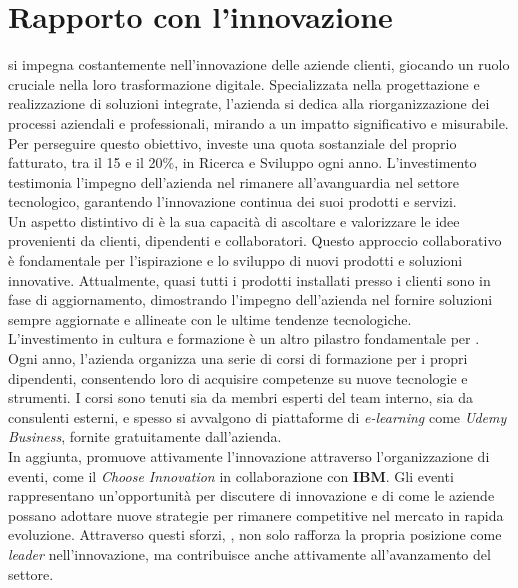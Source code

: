 \section{Rapporto con l'innovazione}

\noindent{\azienda} si impegna costantemente nell'innovazione delle aziende clienti, giocando un ruolo cruciale nella loro trasformazione digitale. 
Specializzata nella progettazione e realizzazione di soluzioni integrate, l'azienda si dedica alla riorganizzazione dei processi aziendali e 
professionali, mirando a un impatto significativo e misurabile. \\
\noindent Per perseguire questo obiettivo, {\azienda} investe una quota sostanziale del proprio fatturato, tra il 15 e il 20\%, 
in Ricerca e Sviluppo ogni anno. L'investimento testimonia l'impegno dell'azienda nel rimanere all'avanguardia nel settore tecnologico, 
garantendo l'innovazione continua dei suoi prodotti e servizi. \\
\noindent Un aspetto distintivo di {\azienda} è la sua capacità di ascoltare e valorizzare le idee provenienti da clienti, dipendenti e collaboratori. 
Questo approccio collaborativo è fondamentale per l'ispirazione e lo sviluppo di nuovi prodotti e soluzioni innovative. Attualmente, quasi tutti i 
prodotti installati presso i clienti sono in fase di aggiornamento, dimostrando l'impegno dell'azienda nel fornire soluzioni sempre aggiornate e 
allineate con le ultime tendenze tecnologiche. \\
\noindent L'investimento in cultura e formazione è un altro pilastro fondamentale per {\azienda}. Ogni anno, l'azienda organizza una serie di corsi 
di formazione per i propri dipendenti, consentendo loro di acquisire competenze su nuove tecnologie e strumenti. 
I corsi sono tenuti sia da membri esperti del team interno, sia da consulenti esterni, e spesso si avvalgono di piattaforme 
di \textit{e-learning} come \textit{Udemy Business}, fornite gratuitamente dall'azienda. \\
\noindent In aggiunta, {\azienda} promuove attivamente l'innovazione attraverso l'organizzazione di eventi, 
come il \textit{Choose Innovation} in collaborazione con \textbf{IBM}. Gli eventi rappresentano un'opportunità per discutere di 
innovazione e di come le aziende possano adottare nuove strategie per rimanere competitive nel mercato in rapida evoluzione. 
Attraverso questi sforzi, {\azienda}, non solo rafforza la propria posizione come \textit{leader} nell'innovazione, ma contribuisce anche 
attivamente all'avanzamento del settore. \\